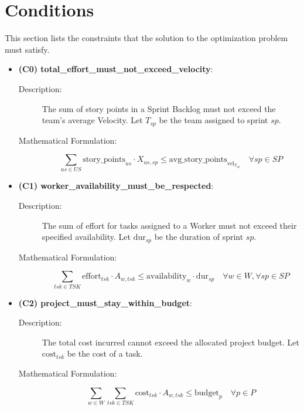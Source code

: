 \documentclass[11pt]{article}
\begin{document}
\section{Conditions}
\label{sec:conditions}
This section lists the constraints that the solution to the optimization problem must satisfy.

\begin{itemize}
    \item \textbf{(C0) total\_effort\_must\_not\_exceed\_velocity}:
    \begin{description}
        \item[Description:] The sum of story points in a Sprint Backlog must not exceed the team's average Velocity. Let $T_{sp}$ be the team assigned to sprint $sp$.
        \item[Mathematical Formulation:]
        $$ \sum_{us \in US} \text{story\_points}_{us} \cdot X_{us, sp} \le \text{avg\_story\_points}_{\text{vel}_{T_{sp}}} \quad \forall sp \in SP $$
    \end{description}

    \item \textbf{(C1) worker\_availability\_must\_be\_respected}:
    \begin{description}
        \item[Description:] The sum of effort for tasks assigned to a Worker must not exceed their specified availability. Let $\text{dur}_{sp}$ be the duration of sprint $sp$.
        \item[Mathematical Formulation:]
        $$ \sum_{tsk \in TSK} \text{effort}_{tsk} \cdot A_{w, tsk} \le \text{availability}_{w} \cdot \text{dur}_{sp} \quad \forall w \in W, \forall sp \in SP $$
    \end{description}

    \item \textbf{(C2) project\_must\_stay\_within\_budget}:
    \begin{description}
        \item[Description:] The total cost incurred cannot exceed the allocated project budget. Let $\text{cost}_{tsk}$ be the cost of a task.
        \item[Mathematical Formulation:]
        $$ \sum_{w \in W} \sum_{tsk \in TSK} \text{cost}_{tsk} \cdot A_{w, tsk} \le \text{budget}_{p} \quad \forall p \in P $$
    \end{description}
    

\end{itemize}
\end{document}
